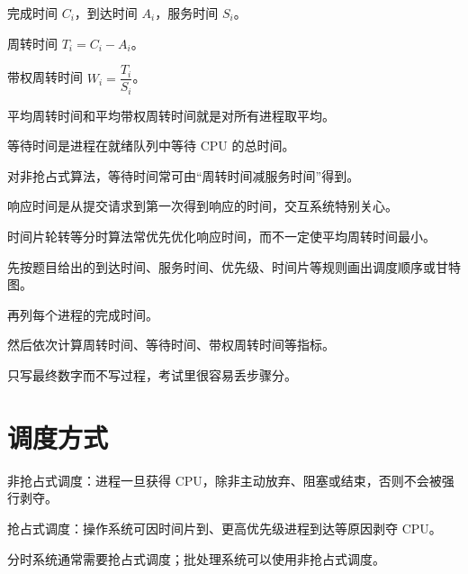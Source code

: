 \begin{points}
  \item 完成时间 $C_i$，到达时间 $A_i$，服务时间 $S_i$。
  \item 周转时间 $T_i=C_i-A_i$。
  \item 带权周转时间 $W_i=\dfrac{T_i}{S_i}$。
  \item 平均周转时间和平均带权周转时间就是对所有进程取平均。
\end{points}


\begin{points}
  \item 等待时间是进程在就绪队列中等待 CPU 的总时间。
  \item 对非抢占式算法，等待时间常可由“周转时间减服务时间”得到。
  \item 响应时间是从提交请求到第一次得到响应的时间，交互系统特别关心。
  \item 时间片轮转等分时算法常优先优化响应时间，而不一定使平均周转时间最小。
\end{points}


\begin{points}
  \item 先按题目给出的到达时间、服务时间、优先级、时间片等规则画出调度顺序或甘特图。
  \item 再列每个进程的完成时间。
  \item 然后依次计算周转时间、等待时间、带权周转时间等指标。
  \item 只写最终数字而不写过程，考试里很容易丢步骤分。
\end{points}


\section{调度方式}
\begin{points}
  \item 非抢占式调度：进程一旦获得 CPU，除非主动放弃、阻塞或结束，否则不会被强行剥夺。
  \item 抢占式调度：操作系统可因时间片到、更高优先级进程到达等原因剥夺 CPU。
  \item 分时系统通常需要抢占式调度；批处理系统可以使用非抢占式调度。
\end{points}


